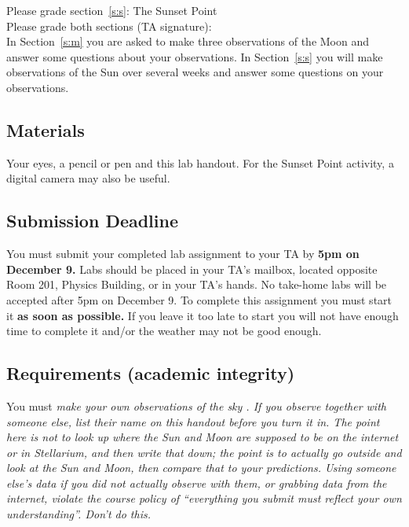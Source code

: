 \documentclass[11pt]{article}
\begin{document}
\vspace*{0.5cm}
\noindent
Please grade section~\ref{s:s}: The Sunset Point \hrulefill\hspace*{6cm}\\

\vspace*{0.5cm}
\noindent
Please grade both sections (TA signature): \hrulefill\hspace*{6cm}\\





In Section~\ref{s:m} you are asked to make three observations of the Moon 
and answer some questions about your observations. In Section~\ref{s:s} you
will make observations of the Sun over several weeks and answer some questions
on your observations.

\subsection*{Materials}

Your eyes, a pencil or pen and this lab handout. For the Sunset Point activity, a digital camera may also be useful.

\subsection*{Submission Deadline}

You must submit your completed lab assignment to your TA by \textbf{5pm on
December 9.} Labs should be placed in your TA's mailbox, located opposite
Room 201, Physics Building, or in your TA's hands. 
No take-home labs will be accepted
after 5pm on December 9. To complete this assignment you must start it
\textbf{as soon as possible.} If you leave it too late to start you will not
have enough time to complete it and/or the weather may not be good enough.

\subsection*{Requirements (academic integrity)}

You must \it make your own observations of the sky \rm. If you observe together with someone else,
list their name on this handout before you turn it in. The point here is not to look up where the 
Sun and Moon are supposed to be on the internet or in Stellarium, and then write that down;
the point is to actually
go outside and look at the Sun and Moon, then compare that to your predictions. Using someone else's
data if you did not actually observe with them, or grabbing data from the internet, violate the course
policy of ``everything you submit must reflect your own understanding''. Don't do this.
\end{document}
